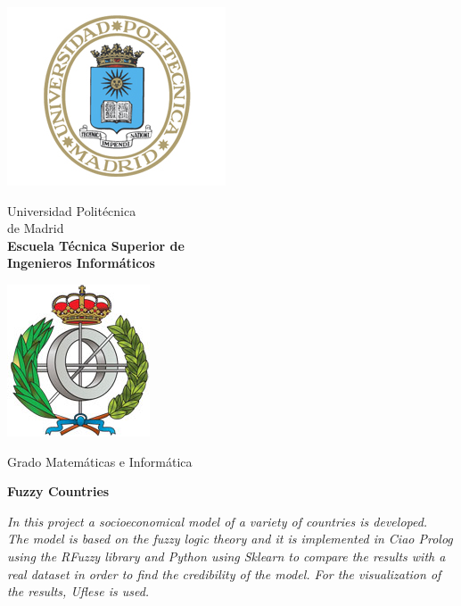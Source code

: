 \begin{titlepage}

\begin{minipage}{0.15\linewidth}
\hspace*{-15mm}
\noindent
\includegraphics[scale=0.5]{front-page/escudo_upm.png}
\end{minipage}
\begin{minipage}{0.7\linewidth}
\begin{center}
\huge{ Universidad Politécnica\\de Madrid }\\
\vspace*{0.5cm}
\Large{\textbf{Escuela Técnica Superior de \\
Ingenieros Informáticos}}
\end{center}
\end{minipage}
\begin{minipage}{0.2\linewidth}
\includegraphics[scale=0.5]{front-page/escudo_etsiinf.png}
\end{minipage}

\vspace*{1cm}
\begin{center}
\Large{Grado Matemáticas e Informática}
\end{center}

\vspace*{2.5cm}
\begin{center}
\huge\bfseries {Fuzzy Countries}
\end{center}

\vspace*{2cm}
\begin{center}
\textit{In this project a socioeconomical model of a variety of countries is developed. 
\\The model is based on the fuzzy logic theory and it is implemented in Ciao Prolog using the RFuzzy library and Python using Sklearn to compare the results with a real dataset in order to find the credibility of the model. For the visualization of the results, Uflese is used.} 
\end{center}


\end{titlepage}
